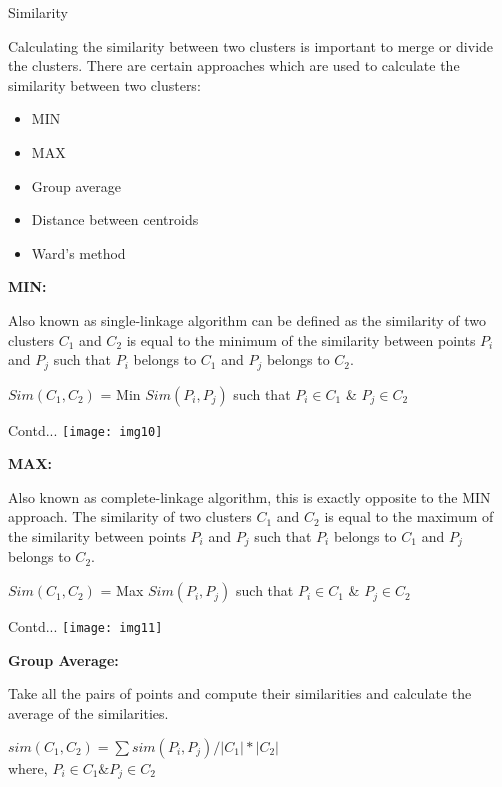 \documentclass{beamer}
\newcommand\myheading[1]{%
  \par\bigskip
  {\large\bfseries#1}\par\smallskip}
\begin{document}
\begin{frame}{Similarity}
	\begin{flushleft}
		Calculating the similarity between two clusters is important to merge or divide the clusters. There are certain approaches which are used to calculate the similarity between two clusters:
		\begin{itemize}
			\item MIN
			\item MAX
			\item Group average
			\item Distance between centroids
			\item Ward's method
		\end{itemize}
		\myheading{MIN:} Also known as single-linkage algorithm can be defined as the similarity of two clusters $C_1$ and $C_2$ is equal to the minimum of the similarity between points $P_i$ and $P_j$ such that $P_i$ belongs to $C_1$ and $P_j$ belongs to $C_2$.\\			
	\end{flushleft}
	$Sim(C_1,C_2)$ = Min $Sim(P_i,P_j)$ such that $P_i \in C_1$ \& $P_j \in C_2$
\end{frame}

\begin{frame}{Contd...}
	\texttt{[image: img10]}
	\begin{flushleft}
	\myheading{MAX:}
		Also known as complete-linkage algorithm, this is exactly opposite to the MIN approach. The similarity of two clusters $C_1$ and $C_2$ is equal to the maximum of the similarity between points $P_i$ and $P_j$ such that $P_i$ belongs to $C_1$ and $P_j$ belongs to $C_2$.\\			
	\end{flushleft}
	$Sim(C_1,C_2)$ = Max $Sim(P_i,P_j)$ such that $P_i \in C_1$ \& $P_j \in C_2$
\end{frame}

\begin{frame}{Contd...}
	\texttt{[image: img11]}
	\begin{flushleft}
		\myheading{Group Average:}
		Take all the pairs of points and compute their similarities and calculate the average of the similarities.
	\end{flushleft}
	$sim(C_1, C_2) = \sum sim(P_i, P_j)/|C_1|*|C_2|$ \\
	\vspace{10pt}
	where, $P_i \in C_1 \& P_j \in C_2$
\end{frame}
\end{document}
